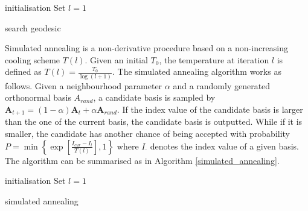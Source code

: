 \documentclass[12pt]{article}
\begin{document}
\begin{algorithm}
\SetAlgoLined
{}
  initialisation\;
  Set $l = 1$\;
  \caption{search geodesic}
  \label{search-geodesic}
\end{algorithm}

Simulated annealing
\citep[\citet{kirkpatrick1983optimization}]{bertsimas1993simulated} is a
non-derivative procedure based on a non-increasing cooling scheme
\(T(l)\). Given an initial \(T_0\), the temperature at iteration \(l\)
is defined as \(T(l) = \frac{T_0}{\log(l + 1)}\). The simulated
annealing algorithm works as follows. Given a neighbourhood parameter
\(\alpha\) and a randomly generated orthonormal basis \(A_{rand}\), a
candidate basis is sampled by
\(\mathbf{A}_{t+1} = (1 - \alpha)\mathbf{A}_{t} + \alpha \mathbf{A}_{rand}\).
If the index value of the candidate basis is larger than the one of the
current basis, the candidate basis is outputted. While if it is smaller,
the candidate has another chance of being accepted with probability
\(P= \min\left\{\exp\left[\frac{I_{cur} - I_{l}}{T(l)}\right],1\right\}\)
where \(I_{\cdot}\) denotes the index value of a given basis. The
algorithm can be summarised as in Algorithm \ref{simulated_annealing}.

\begin{algorithm}
\SetAlgoLined
{}
  initialisation\;
  Set $l = 1$\;
  \caption{simulated annealing}
  \label{simulated_annealing}
\end{algorithm}
\end{document}
